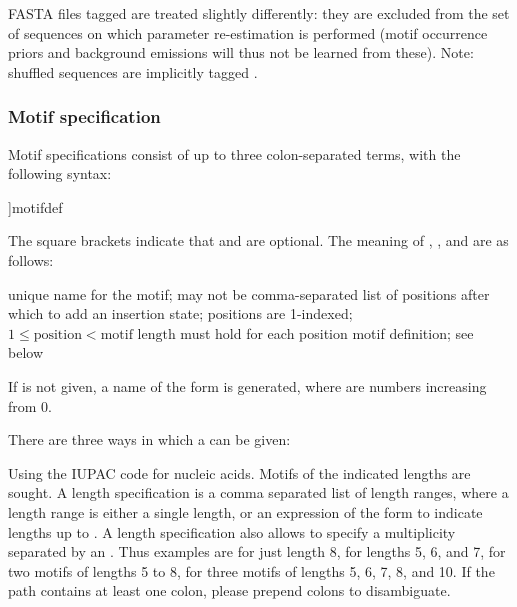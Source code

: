\documentclass[a4paper]{article}
\begin{document}
FASTA files tagged  are treated slightly differently:
they are excluded from the set of sequences on which parameter re-estimation is performed (motif occurrence priors and background emissions will thus not be learned from these).
Note: shuffled sequences are implicitly tagged .

\subsubsection{Motif specification}
\label{section:motif-specification}
Motif specifications consist of up to three colon-separated terms, with the following syntax:

\begin{verbbox}
[name:[insert:]]motifdef
\end{verbbox}
\fbox{\theverbbox[t]}

The square brackets indicate that  and  are optional.
The meaning of , , and  are as follows:

\begin{description}
    unique name for the motif; may not be 
    comma-separated list of positions after which to add an insertion state; positions are 1-indexed; $1 \leq \text{position} < \text{motif length}$ must hold for each position
    motif definition; see below
\end{description}

If  is not given, a name of the form  is generated, where  are numbers increasing from 0.

There are three ways in which a  can be given:

\begin{description}
    Using the IUPAC code for nucleic acids.
    Motifs of the indicated lengths are sought.
    A length specification is a comma separated list of length ranges, where a length range is either a single length, or an expression of the form  to indicate lengths  up to .
    A length specification also allows to specify a multiplicity separated by an .
    Thus examples are  for just length 8,  for lengths 5, 6, and 7,  for two motifs of lengths 5 to 8,  for three motifs of lengths 5, 6, 7, 8, and 10.
    If the path contains at least one colon, please prepend colons to disambiguate.
\end{description}
\end{document}

